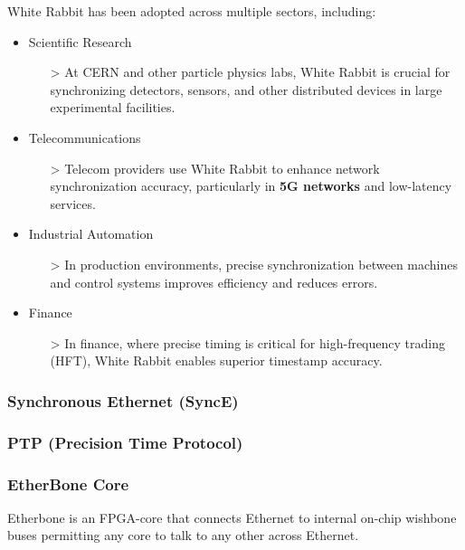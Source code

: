 \vspace{5 mm}

\noindent White Rabbit has been adopted across multiple sectors, including:

\begin{itemize}
\item Scientific Research
    \begin{itemize}
    \item[>] At CERN and other particle physics labs, White Rabbit is crucial for synchronizing detectors, sensors, and other distributed devices in large experimental facilities.
    \end{itemize}
\item Telecommunications
    \begin{itemize}
    \item[>] Telecom providers use White Rabbit to enhance network synchronization accuracy, particularly in \textbf{5G networks} and low-latency services.
    \end{itemize}
\item Industrial Automation
    \begin{itemize}
    \item[>] In production environments, precise synchronization between machines and control systems improves efficiency and reduces errors.
    \end{itemize}
\item Finance
    \begin{itemize}
    \item[>] In finance, where precise timing is critical for high-frequency trading (HFT), White Rabbit enables superior timestamp accuracy.
    \end{itemize}
\end{itemize}

\subsubsection{Synchronous Ethernet (SyncE)}

\subsubsection{PTP (Precision Time Protocol)}

\subsubsection{EtherBone Core}

Etherbone \cite{gl:etherbone-core} is an FPGA-core that connects Ethernet to internal on-chip wishbone buses permitting any core to talk to any other across Ethernet.

